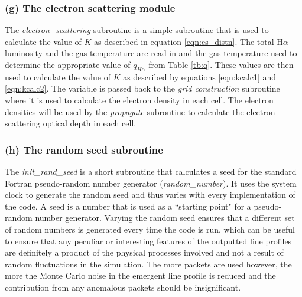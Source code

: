 		\subsubsection{(g) The electron scattering module}
		The \textit{electron\_scattering} subroutine is a simple subroutine that is used to calculate the value of $K$ as described in equation \ref{eqn:es_distn}.  The total H$\alpha$ luminosity and the gas temperature are read in and the gas temperature used to determine the appropriate value of $q_{H\alpha}$ from Table \ref{tb:q}.  These values are then used to calculate the value of $K$ as described by equations \ref{eqn:kcalc1} and \ref{eqn:kcalc2}.  The variable is passed back to the \textit{grid construction} subroutine where it is used to calculate the electron density in each cell.  The electron densities will be used by the \textit{propagate} subroutine to calculate the electron scattering optical depth in each cell.
		
		\subsubsection{(h) The random seed subroutine}
		The \textit{init\_rand\_seed} is a short subroutine that calculates a seed for the standard Fortran pseudo-random number generator (\textit{random\_number}).  It uses the system clock to generate the random seed and thus varies with every implementation of the code.  A seed is a number that is used as a ``starting point" for a pseudo-random number generator.  Varying the random seed ensures that a different set of random numbers is generated every time the code is run, which can be useful to ensure that any peculiar or interesting features of the outputted line profiles are definitely a product of the physical processes involved and not a result of random fluctuations in the simulation.  The more packets are used however, the more the Monte Carlo noise in the emergent line profile is reduced and the contribution from any anomalous packets should be insignificant.
		
